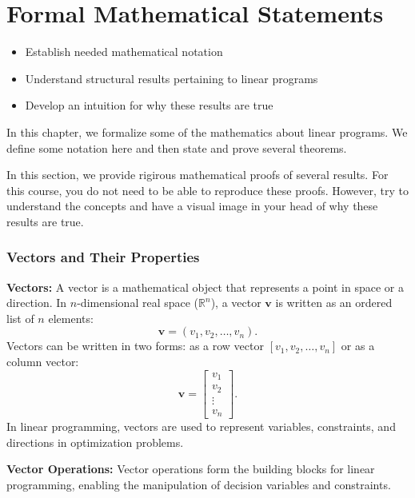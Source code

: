 \chapter{Formal Mathematical Statements}
\begin{outcome}
\begin{itemize}
\item Establish needed mathematical notation
\item Understand structural results pertaining to linear programs
\item Develop an intuition for why these results are true
\end{itemize}
\end{outcome}
In this chapter, we formalize some of the mathematics about linear programs.  We define some notation here and then state and prove several theorems.   

\begin{warn}
In this section, we provide rigirous mathematical proofs of several results.  For this course, you do not need to be able to reproduce these proofs.  However, try to understand the concepts and have a visual image in your head of why these results are true.
\end{warn}
\subsection{Vectors and Their Properties}

\textbf{Vectors:}  
A vector is a mathematical object that represents a point in space or a direction. In \(n\)-dimensional real space (\(\mathbb{R}^n\)), a vector \(\mathbf{v}\) is written as an ordered list of \(n\) elements:  
\[
\mathbf{v} = (v_1, v_2, \dots, v_n).
\]  
Vectors can be written in two forms: as a row vector \([v_1, v_2, \dots, v_n]\) or as a column vector:
\[
\mathbf{v} = \begin{bmatrix} v_1 \\ v_2 \\ \vdots \\ v_n \end{bmatrix}.
\]  
In linear programming, vectors are used to represent variables, constraints, and directions in optimization problems.

\medskip  
\textbf{Vector Operations:}  
Vector operations form the building blocks for linear programming, enabling the manipulation of decision variables and constraints.

